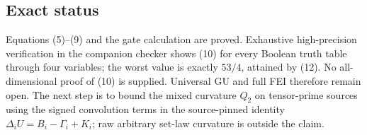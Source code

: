 \subsection*{Exact status}

Equations (5)--(9) and the gate calculation are proved.  Exhaustive
high-precision verification in the companion checker shows (10) for every Boolean truth table through four
variables; the worst value is exactly $53/4$, attained by (12).  No
all-dimensional proof of (10) is supplied.  Universal GU and full FEI
therefore remain open.  The next step is to bound the mixed curvature
$Q_2$ on tensor-prime sources using the signed convolution terms in the
source-pinned identity $\Delta_iU=B_i-\Gamma_i+K_i$; raw arbitrary set-law
curvature is outside the claim.
